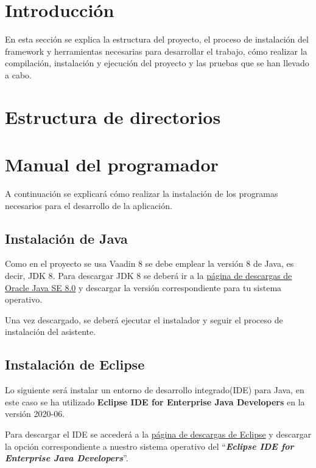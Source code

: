 
\section{Introducción}
En esta sección se explica la estructura del proyecto, el proceso de instalación del framework y herramientas necesarias para desarrollar el trabajo, cómo realizar la compilación, instalación y ejecución del proyecto y las pruebas que se han llevado a cabo.

\section{Estructura de directorios}

\section{Manual del programador}
A continuación se explicará cómo realizar la instalación de los programas necesarios para el desarrollo de la aplicación.

\subsection{Instalación de Java}
Como en el proyecto se usa Vaadin 8 se debe emplear la versión 8 de Java, es decir, JDK 8. Para descargar JDK 8 se deberá ir a la \href{https://www.oracle.com/java/technologies/javase/javase-jdk8-downloads.html}{página de descargas de Oracle Java SE 8.0} y descargar la versión correspondiente para tu sistema operativo.


Una vez descargado, se deberá ejecutar el instalador y seguir el proceso de instalación del asistente.

\subsection{Instalación de Eclipse}
Lo siguiente será instalar un entorno de desarrollo integrado(IDE) para Java, en este caso se ha utilizado \textbf{Eclipse IDE for Enterprise Java Developers} en la versión 2020-06. 

Para descargar el IDE se accederá a la \href{https://www.eclipse.org/downloads/packages/release/2020-06/r}{página de descargas de Eclipse} y descargar la opción correspondiente a nuestro sistema operativo del ``\textbf{\textit{Eclipse IDE for Enterprise Java Developers}}''.

